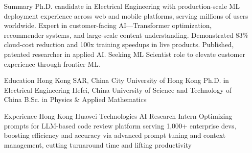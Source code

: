 \documentclass[caps, english]{financecv}
\begin{document}
\begin{cvsection}{Summary}
    Ph.D. candidate in Electrical Engineering with production-scale ML deployment experience across web and mobile platforms, serving millions of users worldwide. Expert in customer-facing AI—Transformer optimization, recommender systems, and large-scale content understanding. Demonstrated 83\% cloud-cost reduction and 100x training speedups in live products. Published, patented researcher in applied AI. Seeking ML Scientist role to elevate customer experience through frontier ML.
\end{cvsection}

\begin{cvsection}{Education}
    {Hong Kong SAR, China}
    {City University of Hong Kong}
    {Ph.D. in Electrical Engineering}
    {}
    {}
    {}
    {}
    {Hefei, China}
    {University of Science and Technology of China}
    {B.Sc. in Physics \& Applied Mathematics}
    {}
    {}
    {}
    {}
\end{cvsection}

\begin{cvsection}{Experience}
    {Hong Kong}
    {Huawei Technologies}
    {AI Research Intern}
    {Optimizing prompts for LLM-based code review platform serving 1,000+ enterprise devs, boosting efficiency and accuracy via advanced prompt tuning and context management, cutting turnaround time and lifting productivity}
    {}
    {}
    {}
\end{cvsection}
\end{document}
